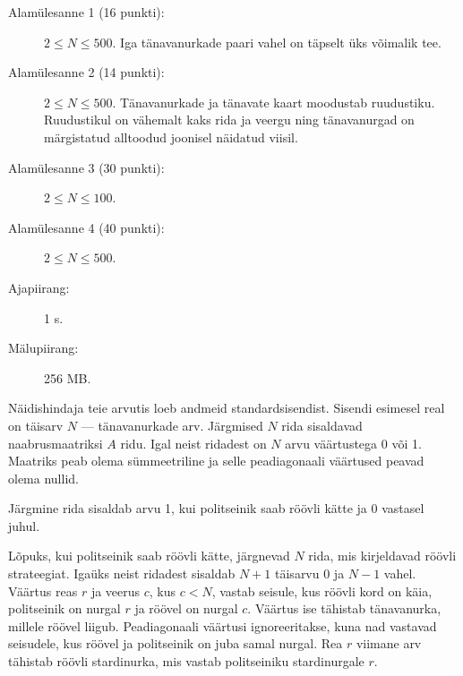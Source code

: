 \documentclass{boi2014}
\begin{document}
    \begin{description}
        \item[Alamülesanne 1 (16 punkti):] $2 \le N \le 500$. Iga tänavanurkade paari vahel on täpselt üks võimalik tee.
        \item[Alamülesanne 2 (14 punkti):] $2 \le N \le 500$. Tänavanurkade ja tänavate kaart 
        moodustab ruudustiku. Ruudustikul on vähemalt
        kaks rida ja veergu ning tänavanurgad on märgistatud alltoodud joonisel
        näidatud viisil.
        \begin{figure}[h!]
           \centering
        \end{figure}
        \item[Alamülesanne 3 (30 punkti):] $2 \le N \le 100$.
        \item[Alamülesanne 4 (40 punkti):] $2 \le N \le 500$.
    \end{description}

    \Constraints
    
    \begin{description}
        \item[Ajapiirang:] 1 s.
        \item[Mälupiirang:] 256 MB.
    \end{description}

    \Experimentation
    Näidishindaja teie arvutis loeb andmeid standardsisendist.
    Sisendi esimesel real on täisarv $N$ --- tänavanurkade arv.
    Järgmised $N$ rida sisaldavad naabrusmaatriksi $A$ ridu.
    Igal neist ridadest on $N$ arvu väärtustega 0 või 1.
    Maatriks peab olema sümmeetriline ja selle peadiagonaali väärtused
    peavad olema nullid.

    Järgmine rida sisaldab arvu 1, kui politseinik saab röövli kätte ja
    0 vastasel juhul.

    Lõpuks, kui politseinik saab röövli kätte, järgnevad $N$ rida, mis kirjeldavad
    röövli strateegiat.  Igaüks neist ridadest sisaldab 
    $N+1$ täisarvu 0 ja $N-1$ vahel.  Väärtus reas $r$ ja veerus $c$,
    kus $c < N$, vastab seisule, kus röövli kord on käia, politseinik
    on nurgal $r$ ja röövel on nurgal $c$.
    Väärtus ise tähistab tänavanurka, millele röövel liigub.  Peadiagonaali
    väärtusi ignoreeritakse, kuna nad vastavad seisudele, kus röövel ja politseinik
    on juba samal nurgal.  Rea $r$ viimane arv tähistab 
    röövli stardinurka, mis vastab politseiniku stardinurgale $r$.
\end{document}
